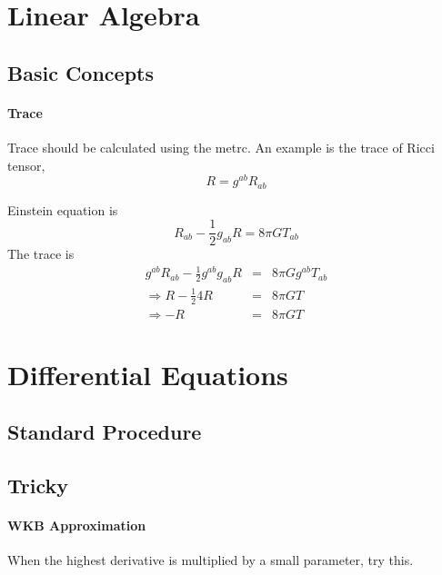\documentclass[11pt]{book}
\begin{document}
\section{Linear Algebra}

\subsection{Basic Concepts}

\paragraph{Trace}
Trace should be calculated using the metrc. An example is the trace of Ricci tensor,
\begin{equation}
R=g^{ab}R_{ab}
\end{equation}

Einstein equation is \begin{equation}
R_{ab}-\frac{1}{2}g_{ab}R=8\pi G T_{ab}
\end{equation}
 The trace is \begin{eqnarray}
g^{ab}R_{ab}-\frac{1}{2}g^{ab}g_{ab}R&=&8\pi G g^{ab}T_{ab} \\
\Rightarrow R-\frac{1}{2} 4 R &=& 8\pi G T \\
\Rightarrow -R&=&8\pi GT
\end{eqnarray}






\section{Differential Equations}

\subsection{Standard Procedure}


\subsection{Tricky}

\paragraph{WKB Approximation}

When the highest derivative is multiplied by a small parameter, try this.
\end{document}
